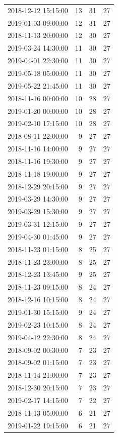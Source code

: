 \begin{tabular}{lrrr}
2018-12-12 15:15:00 & 13 & 31 & 27 \\
2019-01-03 09:00:00 & 12 & 31 & 27 \\
2018-11-13 20:00:00 & 12 & 30 & 27 \\
2019-03-24 14:30:00 & 11 & 30 & 27 \\
2019-04-01 22:30:00 & 11 & 30 & 27 \\
2019-05-18 05:00:00 & 11 & 30 & 27 \\
2019-05-22 21:45:00 & 11 & 30 & 27 \\
2018-11-16 00:00:00 & 10 & 28 & 27 \\
2019-01-20 00:00:00 & 10 & 28 & 27 \\
2019-02-10 17:15:00 & 10 & 28 & 27 \\
2018-08-11 22:00:00 & 9 & 27 & 27 \\
2018-11-16 14:00:00 & 9 & 27 & 27 \\
2018-11-16 19:30:00 & 9 & 27 & 27 \\
2018-11-18 19:00:00 & 9 & 27 & 27 \\
2018-12-29 20:15:00 & 9 & 27 & 27 \\
2019-03-29 14:30:00 & 9 & 27 & 27 \\
2019-03-29 15:30:00 & 9 & 27 & 27 \\
2019-03-31 12:15:00 & 9 & 27 & 27 \\
2019-04-30 01:45:00 & 9 & 27 & 27 \\
2018-11-23 01:15:00 & 8 & 25 & 27 \\
2018-11-23 23:00:00 & 8 & 25 & 27 \\
2018-12-23 13:45:00 & 9 & 25 & 27 \\
2018-11-23 09:15:00 & 8 & 24 & 27 \\
2018-12-16 10:15:00 & 8 & 24 & 27 \\
2019-01-30 15:15:00 & 9 & 24 & 27 \\
2019-02-23 10:15:00 & 8 & 24 & 27 \\
2019-04-12 22:30:00 & 8 & 24 & 27 \\
2018-09-02 00:30:00 & 7 & 23 & 27 \\
2018-09-02 01:15:00 & 7 & 23 & 27 \\
2018-11-14 21:00:00 & 7 & 23 & 27 \\
2018-12-30 20:15:00 & 7 & 23 & 27 \\
2019-02-17 14:15:00 & 7 & 22 & 27 \\
2018-11-13 05:00:00 & 6 & 21 & 27 \\
2019-01-22 19:15:00 & 6 & 21 & 27 \\

\end{tabular}
